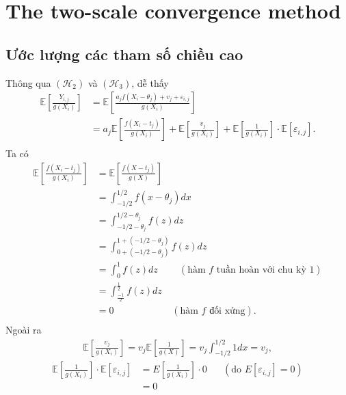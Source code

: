 \chapter{The two-scale convergence method}
\section{Ước lượng các tham số chiều cao}
Thông qua $\left(\mathcal{H}_{2}\right)$ và $\left(\mathcal{H}_{3}\right)$, dễ thấy
$$
\begin{aligned}
\mathbb{E}\left[\frac{Y_{i, j}}{g\left(X_i\right)}\right] & =\mathbb{E}\left[\frac{a_j f\left(X_i-\theta_j\right)+v_j+\varepsilon_{i, j}}{g\left(X_i\right)}\right] \\
& =a_j \mathbb{E}\left[\frac{f\left(X_i-t_j\right)}{g\left(X_i\right)}\right]+\mathbb{E}\left[\frac{v_j}{g\left(X_i\right)}\right]+\mathbb{E}\left[\frac{1}{g\left(X_i\right)}\right] \cdot \mathbb{E}\left[\varepsilon_{i,j}\right] . \\
\end{aligned}
$$
Ta có 
$$
\begin{aligned}
\mathbb{E}\left[\frac{f\left(X_i-t_j\right)}{g\left(X_i\right)}\right] & =\mathbb{E}\left[\frac{f\left(X-t_j\right)}{g\left(X\right)}\right] \\
& =\int_{-1 / 2}^{1 / 2} f\left(x-\theta_j\right) d x\\
& =\int_{-1 / 2-\theta_j}^{1 / 2-\theta_j} f\left(z\right) d z\\
& =\int_{0+\left(-1 / 2-\theta_j\right)}^{1+\left(-1 / 2-\theta_j\right)} f\left(z\right) d z\\
& =\int_{0}^{1} f\left(z\right) d z \;\;\;\;\;\;\;\; \left(\text{hàm $f$ tuần hoàn với chu kỳ $1$}\right)\\
& =\int_{\frac{-1}{2}}^{\frac{1}{2}} f\left(z\right) d z \\
& = 0  \quad \quad \quad \;\;\;\;\;\;\;\;\;\;\; \left(\text{hàm $f$ đối xứng}\right). \\
\end{aligned}
$$
Ngoài ra
$$
\begin{aligned}
\mathbb{E}\left[\frac{v_j}{g\left(X_i\right)}\right] =v_j \mathbb{E}\left[\frac{1}{g\left(X\right)}\right] =v_j\int_{-1 / 2}^{1 / 2} 1 d x= v_j,
\end{aligned}
$$
$$
\begin{aligned}
\mathbb{E}\left[\frac{1}{g\left(X_i\right)}\right] \cdot \mathbb{E}\left[\varepsilon_{i,j}\right] &=E\left[\frac{1}{g\left(X_i\right)}\right] \cdot 0 \;\;\;\;\;\;\left(\text{do }E\left[\varepsilon_{i,j}\right] = 0\right)\\
& = 0
\end{aligned}
$$
